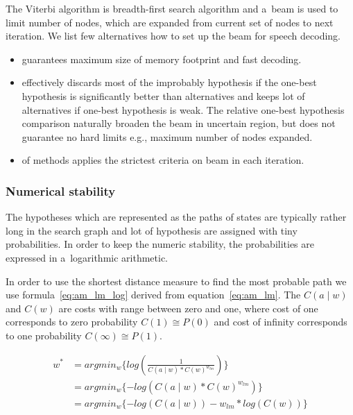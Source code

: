 The Viterbi algorithm is breadth-first search algorithm and a~beam is used to limit number of nodes, which are expanded from current set of nodes to next iteration.
We list few alternatives how to set up the beam for speech decoding.
\begin{itemize}
    \item {} guarantees maximum size of memory footprint and fast decoding.
    \item {} effectively discards most of the improbably hypothesis if the one-best hypothesis is significantly better than alternatives and keeps lot of alternatives if one-best hypothesis is weak.
        The relative one-best hypothesis comparison naturally broaden the beam in uncertain region, but does not guarantee no hard limits e.g., maximum number of nodes expanded.
    \item {} of methods applies the strictest criteria on beam in each iteration.
\end{itemize}

\subsubsection*{Numerical stability}

The hypotheses which are represented as the paths of states are typically rather long in the search graph and lot of hypothesis are assigned with tiny probabilities.
In order to keep the numeric stability, the probabilities are expressed in a~logarithmic arithmetic. 

In order to use the shortest distance measure to find the most probable path we use formula~\ref{eq:am_lm_log} derived from equation~\ref{eq:am_lm}.
The $C(a \mid w)$ and $C(w)$ are costs with range between zero and one, where cost of one corresponds to zero probability $C(1) \cong P(0)$ and cost of infinity corresponds to one probability $C(\infty) \cong P(1)$.

\begin{equation}\label{eq:am_lm_log}
    \begin{split}
        w^* &= argmin_{w}\{log(\frac{1}{C(a \mid w) * C(w)^{w_{lm}}})\} \\
        &= argmin_{w}\{-log(C(a \mid w) * C(w)^{w_{lm}})\} \\
        &= argmin_{w}\{-log(C(a \mid w)) - w_{lm}*log( C(w))\} 
    \end{split}
\end{equation}

